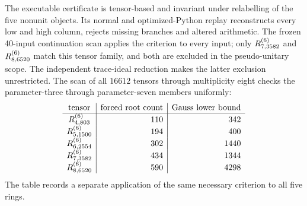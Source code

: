 The executable certificate is tensor-based and invariant under relabelling
of the five nonunit objects.  Its normal and optimized-Python replay
reconstructs every low and high column, rejects missing branches and
altered arithmetic.  The frozen
40-input continuation scan applies the criterion to every input; only
$R^{(6)}_{7,3582}$ and $R^{(6)}_{8,6520}$ match this tensor family, and both are
excluded in the pseudo-unitary scope. The independent trace-ideal
reduction makes the latter exclusion unrestricted. The scan
of all $16612$ tensors through multiplicity eight checks the parameter-three through parameter-seven
members uniformly:
\[
\begin{array}{c|r|r}
\text{tensor}&\text{forced root count}&\text{Gauss lower bound}\\\hline
R^{(6)}_{4,803}&110&342\\
R^{(6)}_{5,1500}&194&400\\
R^{(6)}_{6,2554}&302&1440\\
R^{(6)}_{7,3582}&434&1344\\
R^{(6)}_{8,6520}&590&4298
\end{array}
\]
The table records a separate application of the same necessary criterion
to all five rings.
